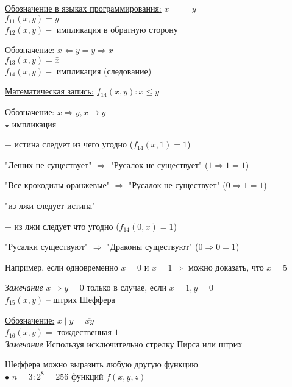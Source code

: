 \documentclass[a4paper, 12pt] {article}
\begin{document}
\underline{Обозначение в языках программирования:} $ x==y $\\

$ f_{11}(x, y)=\bar y $\\

$ f_{12}(x, y)- $ импликация в обратную сторону

\underline{Обозначение:} $ x \Leftarrow y = y \Rightarrow x $\\

$ f_{13}(x, y)=\bar x $\\

$ f_{14}(x, y)- $ импликация (следование)

\underline{Математическая запись:} $ f_{14}(x, y): x \le y $

\underline{Обозначение:} $ x \Rightarrow y, x \rightarrow y $\\

$ \star $ импликация

$ - $ истина следует из чего угодно ($ f_{14}(x, 1)=1 $)

"Леших не существует" $ \Rightarrow $ "Русалок не существует" ($ 1\Rightarrow1=1 $)

"Все крокодилы оранжевые" $ \Rightarrow $ "Русалок не существует" ($ 0\Rightarrow1=1 $)

"из лжи следует истина"

$ - $ из лжи следует что угодно  ($ f_{14}(0, x)=1 $)

"Русалки существуют" $ \Rightarrow $ "Драконы существуют" ($ 0\Rightarrow0=1 $)

Например, если одновременно $ x=0 $ и $ x=1 \Rightarrow$ можно доказать, что $ x=5 $

\textit{Замечание}  $ x \Rightarrow y =0$ только в случае, если $  x=1, y =0 $\\

$ f_{15}(x, y) $ -- штрих Шеффера

\underline{Обозначение:} $ x \mid y = \overline{x y}$\\


$ f_{16}(x, y)= $ тождественная $ 1 $\\

\textit{Замечание} Используя исключительно стрелку Пирса или штрих 

Шеффера можно выразить любую другую функцию\\

$ \bullet $ $ n=3: 2^{8}=256$ функций $ f(x, y, z) $\\
\end{document}
